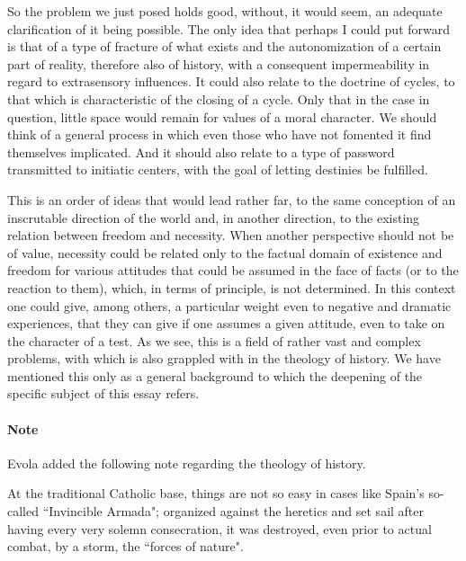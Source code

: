 So the problem we just posed holds good, without, it would seem, an adequate clarification of it being possible. The only idea that perhaps I could put forward is that of a type of fracture of what exists and the autonomization of a certain part of reality, therefore also of history, with a consequent impermeability in regard to extrasensory influences. It could also relate to the doctrine of cycles, to that which is characteristic of the closing of a cycle. Only that in the case in question, little space would remain for values of a moral character. We should think of a general process in which even those who have not fomented it find themselves implicated. And it should also relate to a type of password transmitted to initiatic centers, with the goal of letting destinies be fulfilled.

This is an order of ideas that would lead rather far, to the same conception of an inscrutable direction of the world and, in another direction, to the existing relation between freedom and necessity. When another perspective should not be of value, necessity could be related only to the factual domain of existence and freedom for various attitudes that could be assumed in the face of facts (or to the reaction to them), which, in terms of principle, is not determined. In this context one could give, among others, a particular weight even to negative and dramatic experiences, that they can give if one assumes a given attitude, even to take on the character of a test. As we see, this is a field of rather vast and complex problems, with which is also grappled with in the theology of history. We have mentioned this only as a general background to which the deepening of the specific subject of this essay refers.

\paragraph{Note}
Evola added the following note regarding the theology of history.

\begin{quotex}
At the traditional Catholic base, things are not so easy in cases like Spain's so-called ``Invincible Armada"; organized against the heretics and set sail after having every very solemn consecration, it was destroyed, even prior to actual combat, by a storm, the ``forces of nature". 

\end{quotex}



